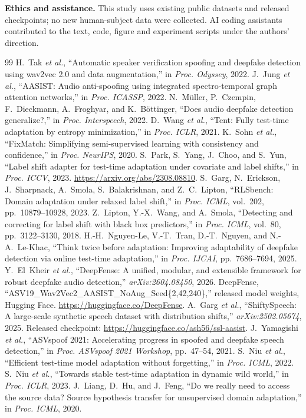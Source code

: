 \documentclass[10pt,letterpaper]{article}
\begin{document}
\clearpage
\balance
\noindent\textbf{Ethics and assistance.} This study uses existing public
datasets and released checkpoints; no new human-subject data were collected. AI
coding assistants contributed to the text, code, figure and experiment scripts
under the authors' direction.

\begin{thebibliography}{99}
 H.~Tak \emph{et al.}, ``Automatic speaker verification
spoofing and deepfake detection using wav2vec 2.0 and data augmentation,'' in
\emph{Proc. Odyssey}, 2022.
 J.~Jung \emph{et al.}, ``AASIST: Audio anti-spoofing using
integrated spectro-temporal graph attention networks,'' in \emph{Proc. ICASSP}, 2022.
 N.~M\"uller, P.~Czempin, F.~Dieckmann, A.~Froghyar, and
K.~B\"ottinger, ``Does audio deepfake detection generalize?,'' in
\emph{Proc. Interspeech}, 2022.
 D.~Wang \emph{et al.}, ``Tent: Fully test-time adaptation by
entropy minimization,'' in \emph{Proc. ICLR}, 2021.
 K.~Sohn \emph{et al.}, ``FixMatch: Simplifying
semi-supervised learning with consistency and confidence,'' in
\emph{Proc. NeurIPS}, 2020.
 S.~Park, S.~Yang, J.~Choo, and S.~Yun, ``Label shift adapter for
test-time adaptation under covariate and label shifts,'' in \emph{Proc. ICCV},
2023. \url{https://arxiv.org/abs/2308.08810}.
 S.~Garg, N.~Erickson, J.~Sharpnack, A.~Smola,
S.~Balakrishnan, and Z.~C.~Lipton, ``RLSbench: Domain adaptation under relaxed
label shift,'' in \emph{Proc. ICML}, vol.~202, pp.~10879--10928, 2023.
 Z.~Lipton, Y.-X.~Wang, and A.~Smola, ``Detecting and correcting
for label shift with black box predictors,'' in \emph{Proc. ICML}, vol.~80,
pp.~3122--3130, 2018.
 H.-H.~Nguyen-Le, V.-T.~Tran, D.-T.~Nguyen, and N.-A.~Le-Khac,
``Think twice before adaptation: Improving adaptability of deepfake detection
via online test-time adaptation,'' in \emph{Proc. IJCAI}, pp.~7686--7694, 2025.
 Y.~El~Kheir \emph{et al.}, ``DeepFense: A unified, modular,
and extensible framework for robust deepfake audio detection,''
\emph{arXiv:2604.08450}, 2026.
 DeepFense, ``ASV19\_\allowbreak Wav2Vec2\_\allowbreak AASIST\_\allowbreak NoAug\_\allowbreak Seed\{2,42,240\},''
released model weights, Hugging Face. \url{https://huggingface.co/DeepFense}.
 A.~Garg \emph{et al.}, ``ShiftySpeech: A large-scale
synthetic speech dataset with distribution shifts,'' \emph{arXiv:2502.05674},
2025. Released checkpoint: \url{https://huggingface.co/ash56/ssl-aasist}.
 J.~Yamagishi \emph{et al.}, ``ASVspoof 2021: Accelerating
progress in spoofed and deepfake speech detection,'' in \emph{Proc. ASVspoof
2021 Workshop}, pp.~47--54, 2021.
 S.~Niu \emph{et al.}, ``Efficient test-time model adaptation
without forgetting,'' in \emph{Proc. ICML}, 2022.
 S.~Niu \emph{et al.}, ``Towards stable test-time adaptation in
dynamic wild world,'' in \emph{Proc. ICLR}, 2023.
 J.~Liang, D.~Hu, and J.~Feng, ``Do we really need to access the
source data? Source hypothesis transfer for unsupervised domain adaptation,''
in \emph{Proc. ICML}, 2020.
\end{thebibliography}
\end{document}
